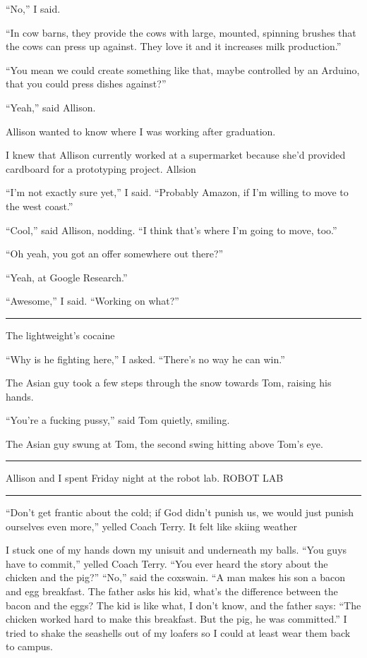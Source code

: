 ``No,'' I said.

``In cow barns, they provide the cows with large, mounted, spinning brushes that
the cows can press up against.  They love it and it increases milk production.''

``You mean we could create something like that, maybe controlled by an Arduino,
that you could press dishes against?''

``Yeah,'' said Allison.

Allison wanted to know where I was working after graduation.

I knew that Allison currently worked at a supermarket because she'd provided
cardboard for a prototyping project.  Allsion 


``I'm not exactly sure yet,'' I said.  ``Probably Amazon, if I'm willing to move
to the west coast.''

``Cool,'' said Allison, nodding.  ``I think that's where I'm going to move,
too.''

``Oh yeah, you got an offer somewhere out there?''

``Yeah, at Google Research.''

``Awesome,'' I said.  ``Working on what?''


\plainfancybreak{12pt}{2}{* * *}

The lightweight's cocaine

``Why is he fighting here,'' I asked.  ``There's no way he can win.'' 

The Asian guy took a few steps through the snow towards Tom, raising his hands.

``You're a fucking pussy,'' said Tom quietly, smiling. 

The Asian guy swung at Tom, the second swing hitting above Tom's eye.

\plainfancybreak{12pt}{2}{* * *}

Allison and I spent Friday night at the robot lab.
ROBOT LAB

\plainfancybreak{12pt}{2}{* * *}

``Don't get frantic about the cold; if God didn't punish us, we would just
punish ourselves even more,'' yelled Coach Terry.  It felt like skiing weather

I stuck one of my hands down my unisuit and underneath my balls.  ``You guys
have to commit,'' yelled Coach Terry.  ``You ever heard the story about the
chicken and the pig?'' ``No,'' said the coxswain.  ``A man makes his son a bacon
and egg breakfast.  The father asks his kid, what's the difference between the
bacon and the eggs?  The kid is like what, I don't know, and the father says:
``The chicken worked hard to make this breakfast.  But the pig, he was
committed.'' I tried to shake the seashells out of my loafers so I could at
least wear them back to campus. 

